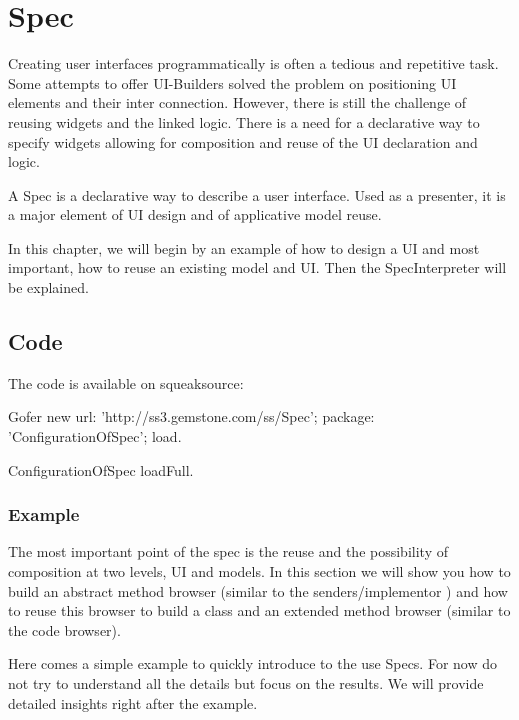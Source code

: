 \documentclass[a4paper,10pt,twoside]{book}
\begin{document}
\fi
\sloppy

\chapter{Spec}

Creating user interfaces programmatically is often a tedious and repetitive task. Some attempts to offer UI-Builders solved the problem on positioning UI elements and their inter connection. However, there is still the challenge of reusing widgets and the linked logic. There is a need for a declarative way to specify widgets allowing for composition and reuse of the UI declaration and logic. 

A Spec is a declarative way to describe a user interface. Used as a presenter, it is a major element of UI design and of applicative model reuse.

In this chapter, we will begin by an example of how to design a UI and most important, how to reuse an existing model and UI. Then the SpecInterpreter will be explained.

\section{Code}

The code is available on squeaksource:
\begin{code}{}
Gofer new
	url: 'http://ss3.gemstone.com/ss/Spec';
	package: 'ConfigurationOfSpec';
	load.
	
ConfigurationOfSpec loadFull.	
\end{code}

\subsection{Example}

The most important point of the spec is the reuse and the possibility of composition at two levels, UI and models. In this section we will show you how to build an abstract method browser (similar to the senders/implementor ) and how to reuse this browser to build a class and an extended method browser (similar to the code browser).

Here comes a simple example to quickly introduce to the use Specs. For now do not try to understand all the details but focus on the results. We will provide detailed insights right after the example.
\end{document}
